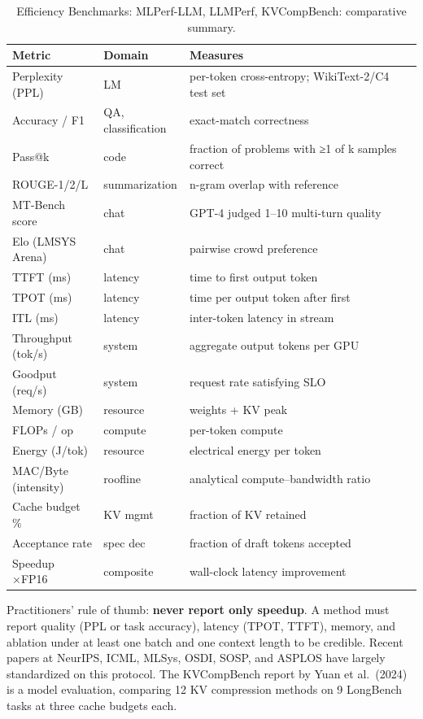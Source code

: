 \documentclass{article}
\begin{document}
\begin{table}[t]
\centering
\caption{Efficiency Benchmarks: MLPerf-LLM, LLMPerf, KVCompBench: comparative summary.}
\label{tab:efficiency-benchmarks-mlperf-llm-llmperf-kvcompbench}
\begin{tabular}{>{\raggedright\arraybackslash}p{0.2299\linewidth}
  >{\raggedright\arraybackslash}p{0.2069\linewidth}
  >{\raggedright\arraybackslash}p{0.5632\linewidth}}
\toprule
Metric & Domain & Measures \\
\midrule
Perplexity (PPL) & LM & per-token cross-entropy; WikiText-2/C4 test set \\
Accuracy / F1 & QA, classification & exact-match correctness \\
Pass@k & code & fraction of problems with ≥1 of k samples correct \\
ROUGE-1/2/L & summarization & n-gram overlap with reference \\
MT-Bench score & chat & GPT-4 judged 1--10 multi-turn quality \\
Elo (LMSYS Arena) & chat & pairwise crowd preference \\
TTFT (ms) & latency & time to first output token \\
TPOT (ms) & latency & time per output token after first \\
ITL (ms) & latency & inter-token latency in stream \\
Throughput (tok/s) & system & aggregate output tokens per GPU \\
Goodput (req/s) & system & request rate satisfying SLO \\
Memory (GB) & resource & weights + KV peak \\
FLOPs / op & compute & per-token compute \\
Energy (J/tok) & resource & electrical energy per token \\
MAC/Byte (intensity) & roofline & analytical compute--bandwidth ratio \\
Cache budget \% & KV mgmt & fraction of KV retained \\
Acceptance rate & spec dec & fraction of draft tokens accepted \\
Speedup ×FP16 & composite & wall-clock latency improvement \\
\end{tabular}
\end{table}

Practitioners' rule of thumb: \textbf{never report only speedup}. A method must report quality (PPL or task accuracy), latency (TPOT, TTFT), memory, and ablation under at least one batch and one context length to be credible. Recent papers at NeurIPS, ICML, MLSys, OSDI, SOSP, and ASPLOS have largely standardized on this protocol. The KVCompBench report by Yuan et al.~(2024) is a model evaluation, comparing 12 KV compression methods on 9 LongBench tasks at three cache budgets each.
\end{document}
